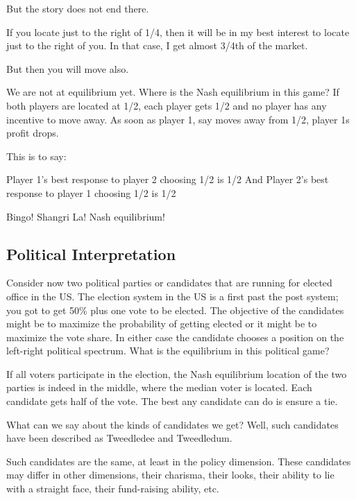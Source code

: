 \documentclass[
]{book}
\begin{document}
But the story does not end there.

If you locate just to the right of 1/4, then it will be in my best interest to locate just to the right of you. In that case, I get almost 3/4th of the market.

\begin{center}
But then you will move also.

\end{center}

We are not at equilibrium yet.
Where is the Nash equilibrium in this game?
If both players are located at 1/2, each player gets 1/2 and no player has any incentive to move away. As soon as player 1, say moves away from 1/2, player 1s profit drops.

This is to say:

\begin{center}
Player 1's best response to player 2 choosing 1/2 is 1/2
And
Player 2's best response to player 1 choosing 1/2 is 1/2

\end{center}

Bingo!
Shangri La!
Nash equilibrium!

\hypertarget{political-interpretation}{%
\subsection{Political Interpretation}\label{political-interpretation}}

Consider now two political parties or candidates that are running for elected office in the US. The election system in the US is a first past the post system; you got to get 50\% plus one vote to be elected. The objective of the candidates might be to maximize the probability of getting elected or it might be to maximize the vote share. In either case the candidate chooses a position on the left-right political spectrum. What is the equilibrium in this political game?

If all voters participate in the election, the Nash equilibrium location of the two parties is indeed in the middle, where the median voter is located. Each candidate gets half of the vote. The best any candidate can do is ensure a tie.

What can we say about the kinds of candidates we get? Well, such candidates have been described as
Tweedledee
and
Tweedledum.

Such candidates are the same, at least in the policy dimension. These candidates may differ in other dimensions, their charisma, their looks, their ability to lie with a straight face, their fund-raising ability, etc.
\end{document}
